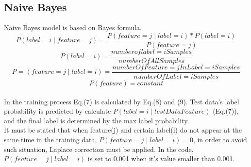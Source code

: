 \documentclass{article}
\begin{document}
\subsection{Naive Bayes}
Naive Bayes model is based on Bayes formula.
\begin{equation}
\label{eqn:somelabel}
P(label = i \mid feature = j) = \frac{P(feature = j \mid label =i)*P(label=i)}{P(feature =j)}
\end{equation}
\begin{equation}
\label{eqn:somelabel}
P(label =i) = \frac{number of label = i Samples}{number Of All Samples}
\end{equation}
\begin{equation}
\label{eqn:somelabel}
P=(feature =j \mid label =i) = \frac{number Of Feature = j In Label = i Samples}{number Of Label = i Samples}
\end{equation}
\begin{equation}
\label{eqn:somelabel}
P(feature) = constant
\end{equation}
\\In the training process Eq.(7) is calculated by Eq.(8) and (9). Test data’s label probability is predicted by calculate $P(label =i\mid test Data Feature)$ (Eq.(7)), and the final label is determined by the max label probability.
\\It must be stated that when feature(j) and certain label(i) do not appear at the same time in the training data, $P(feature=j \mid label=i) = 0$, in order to avoid such situation, Laplace correction must be applied. In the code, $P(feature=j\mid label=i)$ is set to 0.001 when it’s value smaller than 0.001.
\end{document}
